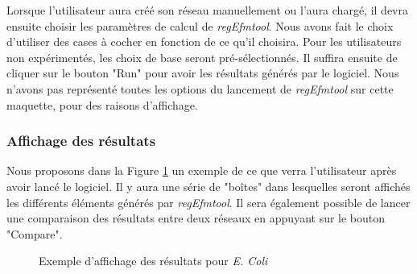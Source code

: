 Lorsque l'utilisateur aura créé son réseau manuellement ou l'aura chargé, il devra ensuite choisir les paramètres de calcul de \textit{regEfmtool}. Nous avons fait le choix d'utiliser des cases à cocher en fonction de ce qu'il choisira. Pour les utilisateurs non expérimentés, les choix de base seront pré-sélectionnés. Il suffira ensuite de cliquer sur le bouton "Run" pour avoir les résultats générés par le logiciel. Nous n'avons pas représenté toutes les options du lancement de \textit{regEfmtool} sur cette maquette, pour des raisons d'affichage.

\pagebreak

\subsubsection{Affichage des résultats}

Nous proposons dans la Figure \ref{affichage} un exemple de ce que verra l'utilisateur après avoir lancé le logiciel. Il y aura une série de "boîtes" dans lesquelles seront affichés les différents éléments générés par \textit{regEfmtool}. Il sera également possible de lancer une comparaison des résultats entre deux réseaux en appuyant sur le bouton "Compare". 

\begin{figure}[!ht]
	\begin{center}
		\caption{Exemple d'affichage des résultats pour \textit{E. Coli}}
  		\label{affichage}
  	\end{center}	
\end{figure}

